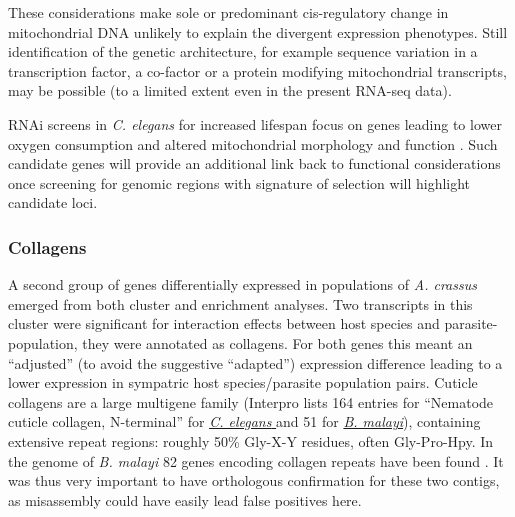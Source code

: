 These considerations make sole or predominant cis-regulatory change in
mitochondrial DNA unlikely to explain the divergent expression
phenotypes. Still identification of the genetic architecture, for
example sequence variation in a transcription factor, a co-factor or a
protein modifying mitochondrial transcripts, may be possible (to a
limited extent even in the present RNA-seq data).

RNAi screens in \textit{C. elegans} for increased lifespan focus on
genes leading to lower oxygen consumption and altered mitochondrial
morphology and function \cite{pmid12447374}. Such candidate genes will
provide an additional link back to functional considerations once
screening for genomic regions with signature of selection will
highlight candidate loci.




\subsubsection{Collagens}
\label{sec:collagens}

A second group of genes differentially expressed in populations of
\textit{A. crassus} emerged from both cluster and enrichment
analyses. Two transcripts in this cluster were significant for
interaction effects between host species and parasite-population, they
were annotated as collagens. For both genes this meant an ``adjusted''
(to avoid the suggestive ``adapted'') expression difference leading to
a lower expression in sympatric host species/parasite population
pairs. Cuticle collagens are a large multigene family (Interpro lists
164 entries for ``Nematode cuticle collagen, N-terminal'' for
\href{http://www.ebi.ac.uk/interpro/ISpy?ipr=IPR002486&tax=6239}{\textit{C. elegans}
} and 51 for
\href{http://www.ebi.ac.uk/interpro/ISpy?ipr=IPR002486&tax=6279}{\textit{B. malayi}}),
containing extensive repeat regions: roughly 50\% Gly-X-Y residues,
often Gly-Pro-Hpy. In the genome of \textit{B. malayi} 82 genes
encoding collagen repeats have been found \cite{ghedin_draft_2007}. It
was thus very important to have orthologous confirmation for these two
contigs, as misassembly could have easily lead false positives here.

